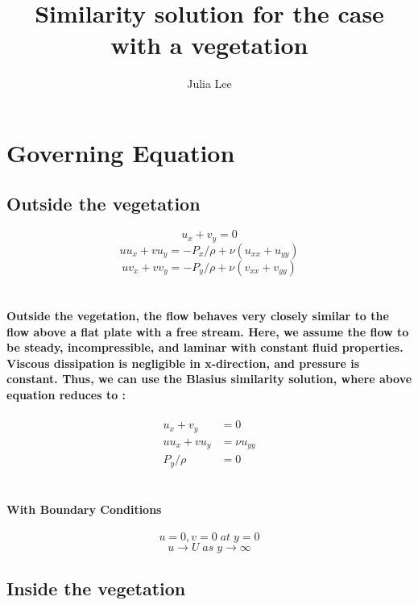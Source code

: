 \documentclass[11pt]{amsart}
\title{Similarity solution for the case with a vegetation}
\author{Julia Lee}
\begin{document}
\maketitle
\section{Governing Equation}
\subsection{Outside the vegetation}
\begin{equation}
u_x+v_y = 0
\end{equation}
\begin{equation}
uu_x+vu_y = -P_x/\rho + \nu (u_{xx} + u_{yy})
\end{equation}
\begin{equation}
uv_x+vv_y = -P_y/\rho + \nu (v_{xx} + v_{yy})
\end{equation}

\paragraph{\\Outside the vegetation, the flow behaves very closely similar to the flow above a flat plate with a free stream. Here, we assume the flow to be steady, incompressible, and laminar with constant fluid properties. Viscous dissipation is negligible in x-direction, and pressure is constant. Thus, we can use the Blasius similarity solution, where above equation reduces to :\\}

\begin{align}
u_x+v_y & = 0 \\
uu_x+vu_y &= \nu u_{yy} \\
P_y/\rho & = 0
\end{align}
\paragraph{ \\With Boundary Conditions\\}
\begin{equation}
u=0, v=0\; at\; y=0
\end{equation}
\begin{equation}
u \rightarrow U\; as\; y \rightarrow \infty
\end{equation}
\subsection{Inside the vegetation}
\end{document}
